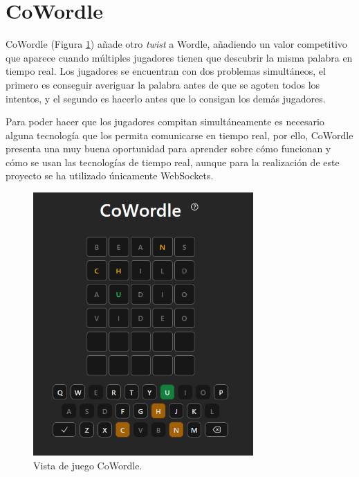 \section{CoWordle}

CoWordle (Figura \ref{fig:cowordle_app}) añade otro \textit{twist} a Wordle, añadiendo un valor competitivo que aparece cuando múltiples jugadores tienen que descubrir la misma palabra en tiempo real. Los jugadores se encuentran con dos problemas simultáneos, el primero es conseguir averiguar la palabra antes de que se agoten todos los intentos, y el segundo es hacerlo antes que lo consigan los demás jugadores.

Para poder hacer que los jugadores compitan simultáneamente es necesario alguna tecnología que los permita comunicarse en tiempo real, por ello, CoWordle presenta una muy buena oportunidad para aprender sobre cómo funcionan y cómo se usan las tecnologías de tiempo real, aunque para la realización de este proyecto se ha utilizado únicamente WebSockets.

\begin{figure}
	\centering
	\includegraphics[clip=true, width=0.75\textwidth]{images/cowordle_app.png}
	\caption{Vista de juego CoWordle.}
	\label{fig:cowordle_app}
\end{figure}
